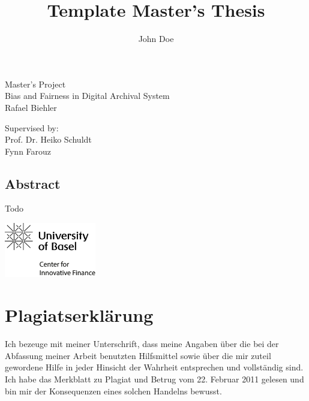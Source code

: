 \documentclass[12pt,a4paper,titlepage,oneside,english]{article}
\title{Template Master's Thesis}
\author{John Doe}
\begin{document}
\begin{center}
\vspace{1em}
\large{Master's Project}\\
\huge Bias and Fairness in Digital Archival System \\
\Large \vspace{1em}
Rafael Biehler
\end{center}

\vspace{1em}
\normalsize
\begin{flushleft}
Supervised by:\\ 
Prof. Dr. Heiko Schuldt \\
Fynn Farouz \\ 
\end{flushleft}

\vspace{1em}
\onehalfspacing
\begin{center}
\section*{Abstract}
\end{center}

Todo


\newpage
{}
\tableofcontents

\vfill
\begin{center}
\includegraphics[width=4cm]{../assetlib/images/logo_cif.png}
\end{center}
\singlespacing
\vspace{-1.5cm}

\section*{Plagiatserklärung}

Ich bezeuge mit meiner Unterschrift, dass meine Angaben über die bei der Abfassung meiner Arbeit benutzten Hilfsmittel sowie über die mir zuteil gewordene Hilfe in jeder Hinsicht der Wahrheit entsprechen und vollständig sind. Ich habe das Merkblatt zu Plagiat und Betrug vom 22. Februar 2011 gelesen und bin mir der Konsequenzen eines solchen Handelns bewusst.
\end{document}
